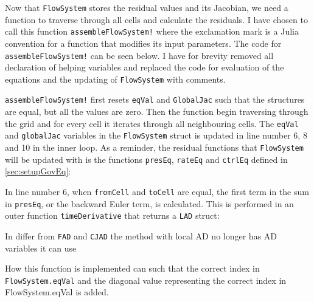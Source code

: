 Now that \texttt{FlowSystem} stores the residual values and its Jacobian, we need a function to traverse through all cells and calculate the residuals.  I have chosen to call this function \texttt{assembleFlowSystem!} where the exclamation mark is a Julia convention for a function that modifies its input parameters. The code for \texttt{assembleFlowSystem!} can be seen below. I have for brevity removed all declaration of helping variables and replaced the code for evaluation of the equations and the updating of \texttt{FlowSystem} with comments.
\lstset{numbers=left}

\lstset{numbers=none}
\texttt{assembleFlowSystem!} first resets \texttt{eqVal} and \texttt{GlobalJac} such that the structures are equal, but all the values are zero. Then the function begin traversing through the grid and for every cell it iterates through all neighbouring cells. The \texttt{eqVal} and \texttt{globalJac} variables in the \texttt{FlowSystem} struct is updated in line number 6, 8 and 10 in the inner loop. As a reminder, the residual functions that \texttt{FlowSystem} will be updated with is the functions \texttt{presEq}, \texttt{rateEq} and \texttt{ctrlEq} defined in \autoref{sec:setupGovEq}:

In line number 6, when \texttt{fromCell} and \texttt{toCell} are equal, the first term in the sum in \texttt{presEq}, or the backward Euler term, is calculated. This is performed in an outer function \texttt{timeDerivative} that returns a \texttt{LAD} struct:

In differ from \texttt{FAD} and \texttt{CJAD} the method with local AD no longer has AD variables it can use 

How this function is implemented can such that the correct index in \texttt{FlowSystem.eqVal} and the diagonal value representing the correct index in FlowSystem.eqVal is added.

